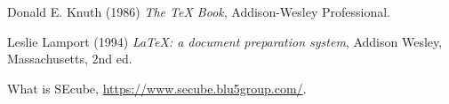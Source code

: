 \begin{thebibliography}{9}

Donald E. Knuth (1986) \emph{The \TeX{} Book}, Addison-Wesley Professional.

Leslie Lamport (1994) \emph{\LaTeX: a document preparation system}, Addison
Wesley, Massachusetts, 2nd ed.

What is SEcube, \url{https://www.secube.blu5group.com/}.
    
\end{thebibliography}